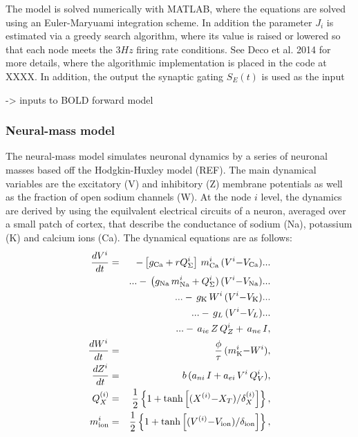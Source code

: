 \documentclass[oneside]{zHenriquesLab-StyleBioRxiv}
\begin{document}
The model is solved numerically with MATLAB, where the equations are solved using an Euler-Maryuami integration scheme. In addition the parameter $J_i$ is estimated via a greedy search algorithm, where its value is raised or lowered so that each node meets the $3Hz$ firing rate conditions. See Deco et al. 2014 for more details, where the algorithmic implementation is placed in the code at XXXX. In addition, the output the synaptic gating $S_{E}(t)$ is used as the input 

-> inputs to BOLD forward model

\subsubsection*{Neural-mass model} 
The neural-mass model simulates neuronal dynamics by a series of neuronal masses based off the Hodgkin-Huxley model (REF). The main dynamical variables are the excitatory (V) and inhibitory (Z) membrane potentials as well as the fraction of open sodium channels (W). At the node $i$ level, the dynamics are derived by using the equilvalent electrical circuits of a neuron, averaged over a small patch of cortex, that describe the conductance of sodium (Na), potassium (K) and calcium ions (Ca). The dynamical equations are as follows:
\begin{eqnarray}
        \frac{dV^i}{dt} &= &-\left[g_{\rm Ca} + rQ_{\Sigma}^i \right]\,m_{\rm Ca}^{i}\,(V^{i} {-} V_{\rm Ca})...\nonumber\\
        & &...- \, \big(g_{\rm Na}\,m_{\rm Na}^{i} + Q_{\Sigma}^i)\,(V^{i} {-} V_{\rm Na})...\nonumber\\
        & &...- \, g_{\rm K}\,W^{i}\,(V^{i} {-} V_{\rm K})...\nonumber\\
        &  &...- \, g_L\,(V^{i} {-} V_L)...\nonumber\\
        &  &...- \, a_{ie}\,Z\,Q_Z^{i}+ \, a_{ne}\,I,\\
        \frac{dW^i}{dt} &= &\frac{\phi}{\tau}\,(m_{\rm K}^{i} {-} W^{i}), \label{eq:potassiumEq}\\
        \frac{dZ^i}{dt} &= &b\,(a_{ni}\,I + a_{ei}\,V^{i}\,Q_V^{i}),\\
        Q_{X}^{(i)} &= &\frac{1}{2} \left\{1 + \tanh\left[(X^{(i)}{-}X_{T})/\delta_{X}^{(i)}\right]\right\}, \\
        m_{\rm ion}^i &= &\frac{1}{2} \left\{1 + \tanh\left[(V^{(i)}{-}V_{\rm ion})/\delta_{\rm ion}\right]\right\},
\end{eqnarray}
\end{document}
